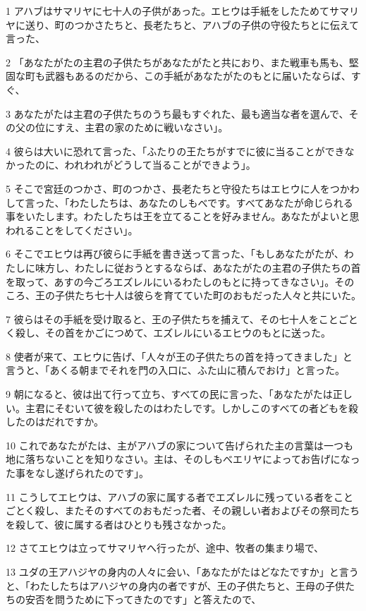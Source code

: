 \par 1 アハブはサマリヤに七十人の子供があった。エヒウは手紙をしたためてサマリヤに送り、町のつかさたちと、長老たちと、アハブの子供の守役たちとに伝えて言った、
\par 2 「あなたがたの主君の子供たちがあなたがたと共におり、また戦車も馬も、堅固な町も武器もあるのだから、この手紙があなたがたのもとに届いたならば、すぐ、
\par 3 あなたがたは主君の子供たちのうち最もすぐれた、最も適当な者を選んで、その父の位にすえ、主君の家のために戦いなさい」。
\par 4 彼らは大いに恐れて言った、「ふたりの王たちがすでに彼に当ることができなかったのに、われわれがどうして当ることができよう」。
\par 5 そこで宮廷のつかさ、町のつかさ、長老たちと守役たちはエヒウに人をつかわして言った、「わたしたちは、あなたのしもべです。すべてあなたが命じられる事をいたします。わたしたちは王を立てることを好みません。あなたがよいと思われることをしてください」。
\par 6 そこでエヒウは再び彼らに手紙を書き送って言った、「もしあなたがたが、わたしに味方し、わたしに従おうとするならば、あなたがたの主君の子供たちの首を取って、あすの今ごろエズレルにいるわたしのもとに持ってきなさい」。そのころ、王の子供たち七十人は彼らを育てていた町のおもだった人々と共にいた。
\par 7 彼らはその手紙を受け取ると、王の子供たちを捕えて、その七十人をことごとく殺し、その首をかごにつめて、エズレルにいるエヒウのもとに送った。
\par 8 使者が来て、エヒウに告げ、「人々が王の子供たちの首を持ってきました」と言うと、「あくる朝までそれを門の入口に、ふた山に積んでおけ」と言った。
\par 9 朝になると、彼は出て行って立ち、すべての民に言った、「あなたがたは正しい。主君にそむいて彼を殺したのはわたしです。しかしこのすべての者どもを殺したのはだれですか。
\par 10 これであなたがたは、主がアハブの家について告げられた主の言葉は一つも地に落ちないことを知りなさい。主は、そのしもべエリヤによってお告げになった事をなし遂げられたのです」。
\par 11 こうしてエヒウは、アハブの家に属する者でエズレルに残っている者をことごとく殺し、またそのすべてのおもだった者、その親しい者およびその祭司たちを殺して、彼に属する者はひとりも残さなかった。
\par 12 さてエヒウは立ってサマリヤへ行ったが、途中、牧者の集まり場で、
\par 13 ユダの王アハジヤの身内の人々に会い、「あなたがたはどなたですか」と言うと、「わたしたちはアハジヤの身内の者ですが、王の子供たちと、王母の子供たちの安否を問うために下ってきたのです」と答えたので、
